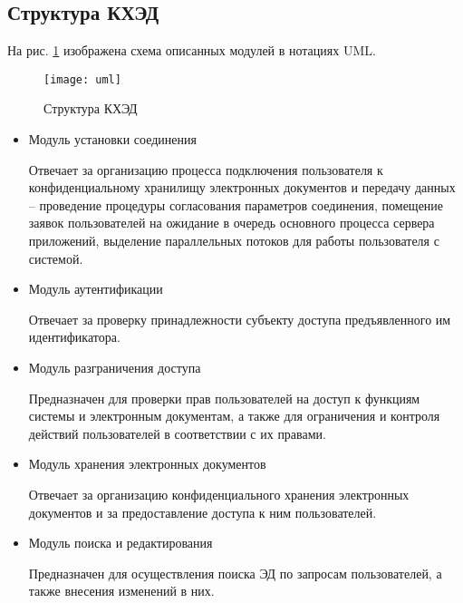 \subsection{Структура КХЭД} \label{storage}

На рис. \ref{img:uml} изображена схема описанных модулей в нотациях UML.

\begin{figure}[p]
  \centering
  \texttt{[image: uml]}
  \caption{Структура КХЭД}
  \label{img:uml}
\end{figure}

\begin{itemize}
\item Модуль установки соединения

Отвечает за организацию процесса подключения пользователя к конфиденциальному хранилищу электронных документов и передачу данных -- проведение процедуры согласования параметров соединения, помещение заявок пользователей на ожидание в очередь основного процесса сервера приложений, выделение параллельных потоков для работы пользователя с системой.

\item Модуль аутентификации

Отвечает за проверку принадлежности субъекту доступа предъявленного им идентификатора.

\item Модуль разграничения доступа

Предназначен для проверки прав пользователей на доступ к функциям системы и электронным документам, а также для ограничения и контроля действий пользователей в соответствии с их правами.

\item Модуль хранения электронных документов

Отвечает за организацию конфиденциального хранения электронных документов и за предоставление доступа к ним пользователей.

\item Модуль поиска и редактирования

Предназначен для осуществления поиска ЭД по запросам пользователей, а также внесения изменений в них.

\end{itemize}